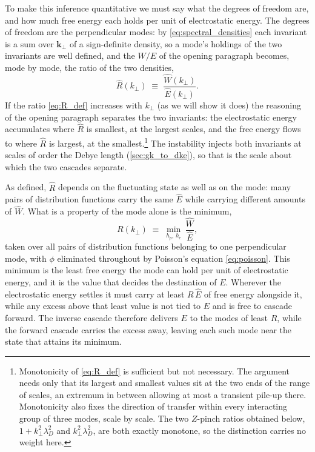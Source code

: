 \documentclass{jpp}
\renewcommand{\vec}[1]{\boldsymbol{#1}}
\newcommand{\vec}[1]{\boldsymbol{#1}}
\newcommand{\kperp}{k_\perp}
\newcommand{\lambdaD}{\lambda_D}
\begin{document}
To make this inference quantitative we must say what the degrees of freedom are, and how much free energy each holds per unit of electrostatic energy. The degrees of freedom are the perpendicular modes: by \cref{eq:spectral_densities} each invariant is a sum over $\vec k_\perp$ of a sign-definite density, so a mode's holdings of the two invariants are well defined, and the $W/E$ of the opening paragraph becomes, mode by mode, the ratio of the two densities,
\begin{equation}\label{eq:R_def}
\hat R(\kperp) \;\equiv\; \frac{\hat W(\kperp)}{\hat E(\kperp)} .
\end{equation}
If the ratio \cref{eq:R_def} increases with $\kperp$ (as we will show it does) the reasoning of the opening paragraph separates the two invariants: the electrostatic energy accumulates where $\hat R$ is smallest, at the largest scales, and the free energy flows to where $\hat R$ is largest, at the smallest.\footnote{Monotonicity of \cref{eq:R_def} is sufficient but not necessary. The argument needs only that its largest and smallest values sit at the two ends of the range of scales, an extremum in between allowing at most a transient pile-up there. Monotonicity also fixes the direction of transfer within every interacting group of three modes, scale by scale. The two $Z$-pinch ratios obtained below, $1+\kperp^2\lambdaD^2$ and $\kperp^2\lambdaD^2$, are both exactly monotone, so the distinction carries no weight here.} The instability injects both invariants at scales of order the Debye length (\cref{sec:gk_to_dke}), so that is the scale about which the two cascades separate.

As defined, $\hat R$ depends on the fluctuating state as well as on the mode: many pairs of distribution functions carry the same $\hat E$ while carrying different amounts of $\hat W$. What is a property of the mode alone is the minimum,
\begin{equation}\label{eq:R_variational}
R(\kperp) \;\equiv\; \min_{h_p,\, h_e}\, \frac{\hat W}{\hat E} ,
\end{equation}
taken over all pairs of distribution functions belonging to one perpendicular mode, with $\phi$ eliminated throughout by Poisson's equation \cref{eq:poisson}. This minimum is the least free energy the mode can hold per unit of electrostatic energy, and it is the value that decides the destination of $E$. Wherever the electrostatic energy settles it must carry at least $R\,\hat E$ of free energy alongside it, while any excess above that least value is not tied to $E$ and is free to cascade forward. The inverse cascade therefore delivers $E$ to the modes of least $R$, while the forward cascade carries the excess away, leaving each such mode near the state that attains its minimum.
\end{document}
